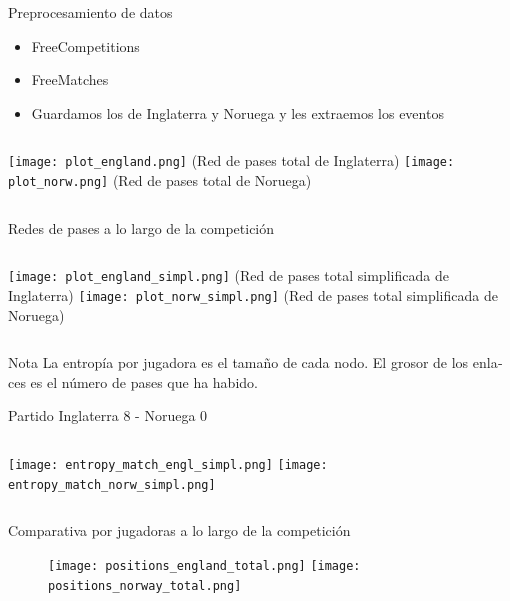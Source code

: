 \documentclass{beamer}
\begin{document}
\begin{frame}{Preprocesamiento de datos}
	\begin{itemize}
		\item FreeCompetitions
		\item FreeMatches
		\item Guardamos los de Inglaterra y Noruega y les extraemos los eventos
	\end{itemize}
	\begin{columns}[t]
		\texttt{[image: plot\_england.png]}
		\footnotesize(Red de pases total de Inglaterra)
		\texttt{[image: plot\_norw.png]}
		\footnotesize(Red de pases total de Noruega)
	\end{columns} 
\end{frame}

\begin{frame}{Redes de pases a lo largo de la competición}
    \begin{columns}[t]
        \texttt{[image: plot\_england\_simpl.png]}
        \footnotesize(Red de pases total simplificada de Inglaterra)
        \texttt{[image: plot\_norw\_simpl.png]}
        \footnotesize(Red de pases total simplificada de Noruega)
    \end{columns} 
	\begin{alertblock}{Nota}
		\textlatin{La entropía por jugadora es el tamaño de cada nodo. El grosor de los enlaces es el 
	 	número de pases que ha habido.}
	\end{alertblock}
\end{frame}

\begin{frame}{Partido Inglaterra 8 - Noruega 0}
		\begin{columns}[t]
			\texttt{[image: entropy\_match\_engl\_simpl.png]}
			\texttt{[image: entropy\_match\_norw\_simpl.png]}
		\end{columns} 
\end{frame}

\begin{frame}{Comparativa por jugadoras a lo largo de la competición}
	\begin{figure}
		\centering
			\texttt{[image: positions\_england\_total.png]}
			\texttt{[image: positions\_norway\_total.png]}
		\end{figure}
\end{frame}
\end{document}
